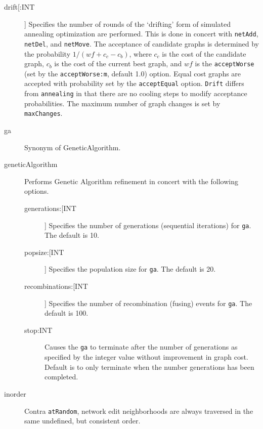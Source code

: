\begin{description}
		\item[drift[:INT]] Specifies the number of rounds of the `drifting' form of simulated 
		annealing optimization \citep{goloboff1999} are performed. This is done in concert 
		with \texttt{netAdd}, \texttt{netDel}, and \texttt{netMove}. The acceptance of candidate 
		graphs is determined by the probability $1/ (wf + c_c - c_b)$, where $c_c$ is the cost 
		of the candidate graph, $c_b$ is the cost of the current best graph, and $wf$ is the 
		\texttt{acceptWorse} (set by the \texttt{acceptWorse:m}, default 1.0) option. Equal 
		cost graphs are accepted with probability set by the \texttt{acceptEqual} option. 
		\texttt{Drift} differs from \texttt{annealing} in that there are no cooling steps to modify 
		acceptance probabilities. The maximum number of graph changes is set by 
		\texttt{maxChanges}.
				
		\item[ga] Synonym of GeneticAlgorithm.
		
		\item[geneticAlgorithm] Performs Genetic Algorithm \citep{Holland1975} refinement in 
		concert with the following options.
					
			\begin{description}
			\item[generations:[INT]] Specifies the number of generations (sequential iterations) for 
			\texttt{ga}. The default is 10.

			\item[popsize:[INT]] Specifies the population size for \texttt{ga}. The default is 
			20.
			
			\item[recombinations:[INT]] Specifies the number of recombination (fusing) events for 
			\texttt{ga}. The default is 100.
			
			
			\item[stop:INT] Causes the \texttt{ga} to terminate after the number of 
			generations as specified by the integer value without improvement in graph 
			cost.  Default is to only terminate when the number generations has been completed.
			\end{description}
		
		\item[inorder] Contra \texttt{atRandom}, network edit neighborhoods are always traversed 
		in the same undefined, but consistent order.


\end{description}
